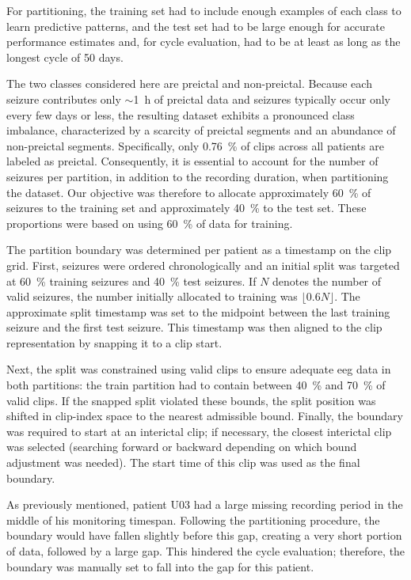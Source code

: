 For partitioning, the training set had to include enough examples of each class to learn predictive patterns, and
the test set had to be large enough for accurate performance estimates and, for cycle evaluation, had to be at least as long as the longest cycle of 50 days.

The two classes considered here are preictal and non-preictal.
Because each seizure contributes only $\sim$\SI{1}{\hour} of preictal data and seizures typically occur only every few days or less, the resulting dataset exhibits a pronounced class imbalance, characterized by a scarcity of preictal segments and an abundance of non-preictal segments.
Specifically, only \SI{0.76}{\percent} of clips across all patients are labeled as preictal.
Consequently, it is essential to account for the number of seizures per partition, in addition to the recording duration, when partitioning the dataset.
Our objective was therefore to allocate approximately \SI{60}{\percent} of seizures to the training set and approximately \SI{40}{\percent} to the test set.
These proportions were based on \textcite{yang_seizure_2024} using \SI{60}{\percent} of data for training.

The partition boundary was determined per patient as a timestamp on the clip grid.
First, seizures were ordered chronologically and an initial split was targeted at \SI{60}{\percent} training seizures and \SI{40}{\percent} test seizures.
If $N$ denotes the number of valid seizures, the number initially allocated to training was $\lfloor 0.6N \rfloor$.
The approximate split timestamp was set to the midpoint between the last training seizure and the first test seizure.
This timestamp was then aligned to the clip representation by snapping it to a clip start.

Next, the split was constrained using valid clips to ensure adequate \gls{eeg} data in both partitions: the train partition had to contain between \SI{40}{\percent} and \SI{70}{\percent} of valid clips.
If the snapped split violated these bounds, the split position was shifted in clip-index space to the nearest admissible bound.
Finally, the boundary was required to start at an interictal clip; if necessary, the closest interictal clip was selected (searching forward or backward depending on which bound adjustment was needed).
The start time of this clip was used as the final boundary.

As previously mentioned, patient U03 had a large missing recording period in the middle of his monitoring timespan.
Following the partitioning procedure, the boundary would have fallen slightly before this gap, creating a very short portion of data, followed by a large gap.
This hindered the cycle evaluation; therefore, the boundary was manually set to fall into the gap for this patient.


